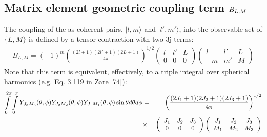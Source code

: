 \documentclass[letterpaper,table,10pt,english]{jupyterBook}
\begin{document}
\subsection{Matrix element geometric coupling term \protect\(B_{L,M}\protect\)}
\label{\detokenize{part1/theory_tensor_formalism_160723:matrix-element-geometric-coupling-term-b-l-m}}\label{\detokenize{part1/theory_tensor_formalism_160723:sec-theory-blm-term}}
\sphinxAtStartPar
The coupling of the {\hyperref[\detokenize{backmatter/glossary:term-partial-waves}]{}} as coherent pairs, \(|l,m\rangle\) and \(|l',m'\rangle\), into the observable set of \(\{L,M\}\) is defined by a tensor contraction with two 3j terms:
\begin{equation}\label{equation:part1/theory_tensor_formalism_160723:eq:basis-BLM-defn}
\begin{split}
B_{L,M}=(-1)^{m}\left(\frac{(2l+1)(2l'+1)(2L+1)}{4\pi}\right)^{1/2}\left(\begin{array}{ccc}
l & l' & L\\
0 & 0 & 0
\end{array}\right)\left(\begin{array}{ccc}
l & l' & L\\
-m & m' & M
\end{array}\right)
\end{split}
\end{equation}
\sphinxAtStartPar
Note that this term is equivalent, effectively, to a triple integral over spherical harmonics (e.g. Eq. 3.119 in Zare {[}\hyperlink{cite.backmatter/bibliography:id968}{74}{]}):
\begin{equation*}
\begin{split}
\begin{aligned}
\intop_{0}^{2\pi}\intop_{0}^{\pi}Y_{J_{3}M_{3}}(\theta,\phi)Y_{J_{2}M_{2}}(\theta,\phi)Y_{J_{1}M_{1}}(\theta,\phi)\sin\theta d\theta d\phi & = & \left(\frac{(2J_{1}+1)(2J_{2}+1)(2J_{3}+1)}{4\pi}\right)^{1/2}\\
 & \times & \left(\begin{array}{ccc}
J_{1} & J_{2} & J_{3}\\
0 & 0 & 0
\end{array}\right)\left(\begin{array}{ccc}
J_{1} & J_{2} & J_{3}\\
M_{1} & M_{2} & M_{3}
\end{array}\right)
\end{aligned}
\end{split}
\end{equation*}
\end{document}
